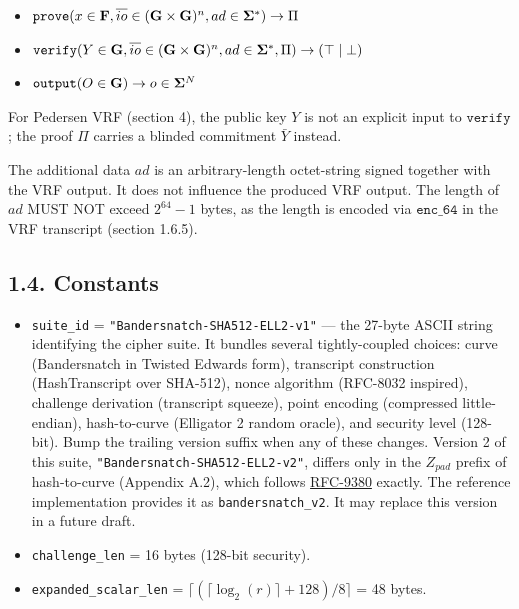\documentclass[
]{article}
\providecommand{\tightlist}{%
  \setlength{\itemsep}{0pt}\setlength{\parskip}{0pt}}
\begin{document}
\begin{itemize}
\tightlist
\item
  \(\texttt{prove}(x \in \bold{F}, \overline{io} \in (\bold{G}\times \bold{G})^n, ad \in \bold{\Sigma}^*) \to \Pi\)
\item
  \(\texttt{verify}(Y \in \bold{G}, \overline{io} \in (\bold{G}\times \bold{G})^n, ad \in \bold{\Sigma}^*, \Pi) \to (\top \mid \bot)\)
\item
  \(\texttt{output}(O \in \bold{G}) \to o \in \bold{\Sigma}^N\)
\end{itemize}

For Pedersen VRF (section 4), the public key \(Y\) is not an explicit
input to \(\texttt{verify}\); the proof \(\Pi\) carries a blinded
commitment \(\bar{Y}\) instead.

The additional data \(ad\) is an arbitrary-length octet-string signed
together with the VRF output. It does not influence the produced VRF
output. The length of \(ad\) MUST NOT exceed \(2^{64} - 1\) bytes, as
the length is encoded via \(\texttt{enc\_64}\) in the VRF transcript
(section 1.6.5).

\subsection{1.4. Constants}\label{constants}

\begin{itemize}
\item
  \texttt{suite\_id} = \texttt{"Bandersnatch-SHA512-ELL2-v1"} --- the
  27-byte ASCII string identifying the cipher suite. It bundles several
  tightly-coupled choices: curve (Bandersnatch in Twisted Edwards form),
  transcript construction (HashTranscript over SHA-512), nonce algorithm
  (RFC-8032 inspired), challenge derivation (transcript squeeze), point
  encoding (compressed little-endian), hash-to-curve (Elligator 2 random
  oracle), and security level (128-bit). Bump the trailing version
  suffix when any of these changes. Version 2 of this suite,
  \texttt{"Bandersnatch-SHA512-ELL2-v2"}, differs only in the
  \(Z_{pad}\) prefix of hash-to-curve (Appendix A.2), which follows
  \href{https://datatracker.ietf.org/doc/rfc9380}{RFC-9380} exactly. The
  reference implementation provides it as \texttt{bandersnatch\_v2}. It
  may replace this version in a future draft.
\item
  \texttt{challenge\_len} = 16 bytes (128-bit security).
\item
  \texttt{expanded\_scalar\_len} =
  \(\lceil(\lceil\log_2(r)\rceil + 128) / 8\rceil\) = 48 bytes.
\end{itemize}
\end{document}
